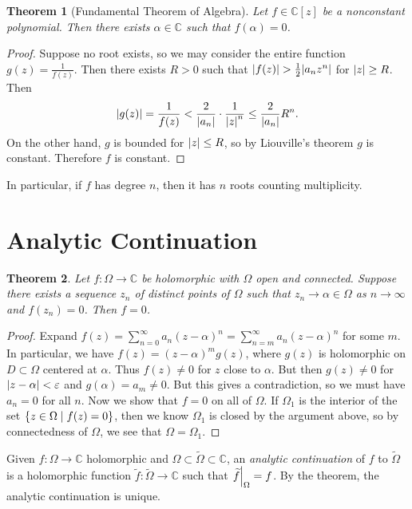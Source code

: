 \documentclass[leqno, openany]{memoir}
\newtheorem{thm}{Theorem}[section]
\theoremstyle{definition}
\theoremstyle{remark}
\theoremstyle{plain}
\theoremstyle{definition}
\theoremstyle{remark}
\newcommand{\C}{\mathbb{C}}
\newcommand{\ep}{\varepsilon}
\newcommand{\wt}[1]{\widetilde{#1}}
\begin{document}
\begin{thm}[Fundamental Theorem of Algebra] Let $f \in \C[z]$ be a nonconstant
polynomial. Then there exists $\alpha \in \C$ such that $f(\alpha) = 0$.
\end{thm}

\begin{proof} Suppose no root exists, so we may consider the entire function
    $g(z) = \frac{1}{f(z)}$. Then there exists $R > 0$ such that $\abs{f(z)} >
    \frac{1}{2} \abs{a_n z^n}$ for $\abs{z} \geq R$. Then \[ \abs{g(z)} =
    \frac{1}{f(z)} < \frac{2}{\abs{a_n}} \cdot \frac{1}{\abs{z}^n} \leq
\frac{2}{\abs{a_n}} R^n. \] On the other hand, $g$ is bounded for $\abs{z} \leq
R$, so by Liouville's theorem $g$ is constant. Therefore $f$ is constant.
\end{proof}

In particular, if $f$ has degree $n$, then it has $n$ roots counting
multiplicity.

\section{Analytic Continuation}%

\begin{thm} Let $f \colon \Omega \to \C$ be holomorphic with $\Omega$ open and
    connected. Suppose there exists a sequence $z_n$ of distinct points of
    $\Omega$ such that $z_n \to \alpha \in \Omega$ as $n \to \infty$ and
    $f(z_n) = 0$. Then $f = 0$.  \end{thm}

\begin{proof} Expand $f(z) = \sum_{n=0}^{\infty} a_n {(z-\alpha)}^n =
    \sum_{n=m}^{\infty} a_n {(z-\alpha)}^n$ for some $m$. In particular, we
    have $f(z) = {(z-\alpha)}^m g(z)$, where $g(z)$ is holomorphic on $D
    \subset \Omega$ centered at $\alpha$. Thus $f(z) \neq 0$ for $z$ close to
    $\alpha$. But then $g(z) \neq 0$ for $\abs{z-\alpha} < \ep$ and $g(\alpha)
    = a_m \neq 0$. But this gives a contradiction, so we must have $a_n = 0$
    for all $n$. Now we show that $f = 0$ on all of $\Omega$. If $\Omega_1$ is
    the interior of the set $\qty{z \in \Omega \mid f(z) = 0}$, then we know
    $\Omega_1$ is closed by the argument above, so by connectedness of
    $\Omega$, we see that $\Omega = \Omega_1$.  \end{proof}

Given $f \colon \Omega \to \C$ holomorphic and $\Omega \subset \wt{\Omega}
\subset \C$, an \textit{analytic continuation} of $f$ to $\wt{\Omega}$ is a
holomorphic function $\wt{f} \colon \wt{\Omega} \to \C$ such that
$\eval{\wt{f}}_{\Omega} = f$. By the theorem, the analytic continuation is
unique.
\end{document}
